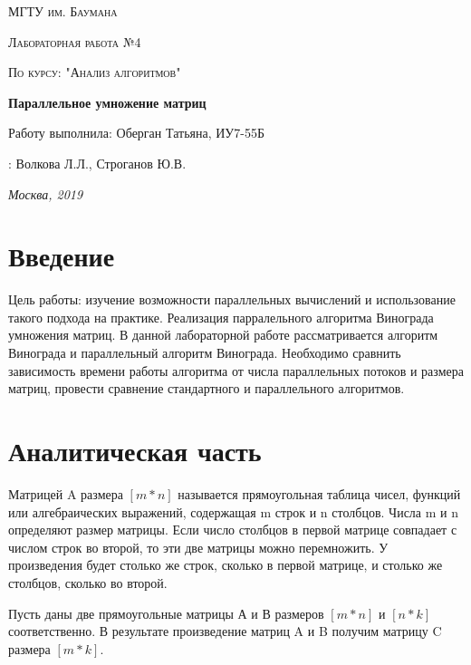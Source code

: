 \documentclass[12pt]{report}
\begin{document}
\begin{titlepage}
	\centering
	{\scshape\LARGE МГТУ им. Баумана \par}
	\vspace{3cm}
	{\scshape\Large Лабораторная работа №4\par}
	\vspace{0.5cm}	
	{\scshape\Large По курсу: "Анализ алгоритмов"\par}
	\vspace{1.5cm}
	{\huge\bfseries Параллельное умножение матриц\par}
	\vspace{2cm}
	\Large Работу выполнила: Оберган Татьяна, ИУ7-55Б\par
	\vspace{0.5cm}
	:  Волкова Л.Л., Строганов Ю.В.\par

	\vfill
	\large \textit {Москва, 2019} \par
\end{titlepage}

\tableofcontents

\newpage
\chapter*{Введение}
Цель работы: изучение возможности параллельных вычислений и использование такого подхода на практике. Реализация парралельного алгоритма Винограда умножения матриц. В данной лабораторной работе рассматривается алгоритм Винограда и параллельный алгоритм Винограда. Необходимо сравнить зависимость времени работы алгоритма от числа параллельных потоков и размера матриц, провести сравнение стандартного и параллельного алгоритмов.



\chapter{Аналитическая часть}
Матрицей A размера $[m*n]$ называется прямоугольная таблица
чисел, функций или алгебраических выражений, содержащая m строк и n столбцов. Числа m и n определяют размер матрицы.\cite{Beloysov} Если число столбцов в первой матрице совпадает с числом строк во второй, то эти две матрицы можно перемножить. У произведения будет столько же строк, сколько в первой матрице, и столько же столбцов, сколько во второй.
	    
Пусть даны две прямоугольные матрицы А и В размеров $[m * n]$ и $[n * k]$ соответственно.  
В результате произведение матриц A и B получим матрицу C размера $[m *  k]$.
\end{document}
